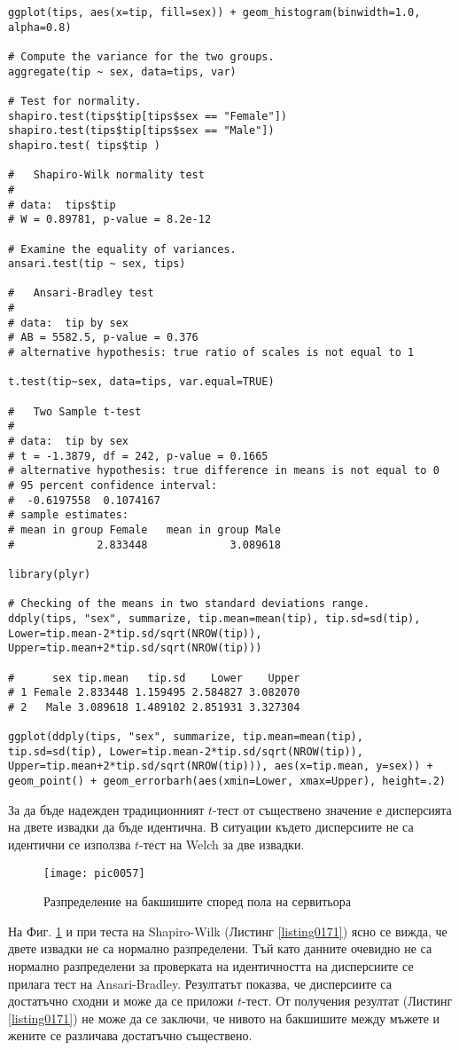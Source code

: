 \begin{lstlisting}[caption=Сравнение на две извадки, label=listing0171]
ggplot(tips, aes(x=tip, fill=sex)) + geom_histogram(binwidth=1.0, alpha=0.8)

# Compute the variance for the two groups.
aggregate(tip ~ sex, data=tips, var)

# Test for normality.
shapiro.test(tips$tip[tips$sex == "Female"])
shapiro.test(tips$tip[tips$sex == "Male"])
shapiro.test( tips$tip )

# 	Shapiro-Wilk normality test
# 
# data:  tips$tip
# W = 0.89781, p-value = 8.2e-12

# Examine the equality of variances.
ansari.test(tip ~ sex, tips)

# 	Ansari-Bradley test
# 
# data:  tip by sex
# AB = 5582.5, p-value = 0.376
# alternative hypothesis: true ratio of scales is not equal to 1

t.test(tip~sex, data=tips, var.equal=TRUE)

# 	Two Sample t-test
# 
# data:  tip by sex
# t = -1.3879, df = 242, p-value = 0.1665
# alternative hypothesis: true difference in means is not equal to 0
# 95 percent confidence interval:
#  -0.6197558  0.1074167
# sample estimates:
# mean in group Female   mean in group Male 
#             2.833448             3.089618

library(plyr)

# Checking of the means in two standard deviations range.
ddply(tips, "sex", summarize, tip.mean=mean(tip), tip.sd=sd(tip), Lower=tip.mean-2*tip.sd/sqrt(NROW(tip)), Upper=tip.mean+2*tip.sd/sqrt(NROW(tip))) 

#      sex tip.mean   tip.sd    Lower    Upper
# 1 Female 2.833448 1.159495 2.584827 3.082070
# 2   Male 3.089618 1.489102 2.851931 3.327304

ggplot(ddply(tips, "sex", summarize, tip.mean=mean(tip), tip.sd=sd(tip), Lower=tip.mean-2*tip.sd/sqrt(NROW(tip)), Upper=tip.mean+2*tip.sd/sqrt(NROW(tip))), aes(x=tip.mean, y=sex)) + geom_point() + geom_errorbarh(aes(xmin=Lower, xmax=Upper), height=.2)
\end{lstlisting}

За да бъде надежден традиционният $t$-тест от съществено значение е дисперсията на двете извадки да бъде идентична. В ситуации където дисперсиите не са идентични се използва $t$-тест на Welch за две извадки. 

\begin{figure}[h!]
  \centering
  \texttt{[image: pic0057]}
  \caption{Разпределение на бакшишите според пола на сервитьора}
\label{figure0057}
\end{figure}
\FloatBarrier

На Фиг. \ref{figure0057} и при теста на Shapiro-Wilk (Листинг \ref{listing0171}) ясно се вижда, че двете извадки не са нормално разпределени. Тъй като данните очевидно не са нормално разпределени за проверката на идентичността на дисперсиите се прилага тест на Ansari-Bradley. Резултатът показва, че дисперсиите са достатъчно сходни и може да се приложи $t$-тест. От получения резултат (Листинг \ref{listing0171}) не може да се заключи, че нивото на бакшишите между мъжете и жените се различава достатъчно съществено. 


